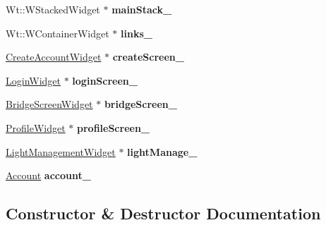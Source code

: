 \begin{DoxyCompactItemize}
\item 
Wt\+::\+W\+Stacked\+Widget $\ast$ {\bfseries main\+Stack\+\_\+}\hypertarget{classWelcomeScreen_aa6c17ce8f5bfd42984336cb3e2ac3463}{}\label{classWelcomeScreen_aa6c17ce8f5bfd42984336cb3e2ac3463}

\item 
Wt\+::\+W\+Container\+Widget $\ast$ {\bfseries links\+\_\+}\hypertarget{classWelcomeScreen_aea50aeb2ceeaa7046396a48dcbb12271}{}\label{classWelcomeScreen_aea50aeb2ceeaa7046396a48dcbb12271}

\item 
\hyperlink{classCreateAccountWidget}{Create\+Account\+Widget} $\ast$ {\bfseries create\+Screen\+\_\+}\hypertarget{classWelcomeScreen_a6957eca431d149cdc83febea171247fb}{}\label{classWelcomeScreen_a6957eca431d149cdc83febea171247fb}

\item 
\hyperlink{classLoginWidget}{Login\+Widget} $\ast$ {\bfseries login\+Screen\+\_\+}\hypertarget{classWelcomeScreen_a5be85a6336144771ac59e1ae10ac4711}{}\label{classWelcomeScreen_a5be85a6336144771ac59e1ae10ac4711}

\item 
\hyperlink{classBridgeScreenWidget}{Bridge\+Screen\+Widget} $\ast$ {\bfseries bridge\+Screen\+\_\+}\hypertarget{classWelcomeScreen_ab83d4d326b0205cf8e56dbe1b53055df}{}\label{classWelcomeScreen_ab83d4d326b0205cf8e56dbe1b53055df}

\item 
\hyperlink{classProfileWidget}{Profile\+Widget} $\ast$ {\bfseries profile\+Screen\+\_\+}\hypertarget{classWelcomeScreen_a018888199a71b1c16bcf16b1b49f2d73}{}\label{classWelcomeScreen_a018888199a71b1c16bcf16b1b49f2d73}

\item 
\hyperlink{classLightManagementWidget}{Light\+Management\+Widget} $\ast$ {\bfseries light\+Manage\+\_\+}\hypertarget{classWelcomeScreen_a4bd816f28e599ade3e31c90e9e5e7ea7}{}\label{classWelcomeScreen_a4bd816f28e599ade3e31c90e9e5e7ea7}

\item 
\hyperlink{classAccount}{Account} {\bfseries account\+\_\+}\hypertarget{classWelcomeScreen_a061965fc25cdc564b17ec23880a56e20}{}\label{classWelcomeScreen_a061965fc25cdc564b17ec23880a56e20}

\end{DoxyCompactItemize}


\subsection{Constructor \& Destructor Documentation}
